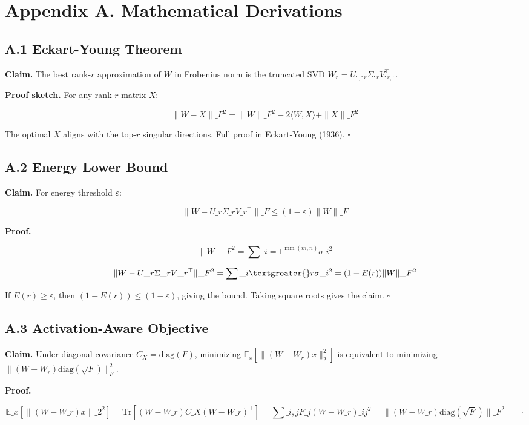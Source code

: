 
\section{Appendix A. Mathematical Derivations}

\subsection{A.1 Eckart-Young Theorem}

\textbf{Claim.} The best rank-$r$ approximation of $W$ in Frobenius norm is the 
truncated SVD $W_r = U_{:, :r} \Sigma_{:r} V_{:r, :}^\top$.

\textbf{Proof sketch.} For any rank-$r$ matrix $X$:

\[
\|W - X\|\_F^2 = \|W\|\_F^2 - 2 \langle W, X \rangle + \|X\|\_F^2
\]

The optimal $X$ aligns with the top-$r$ singular directions. Full proof in 
Eckart-Young (1936). $\square$

\subsection{A.2 Energy Lower Bound}

\textbf{Claim.} For energy threshold $\varepsilon$:

\[
\|W - U\_r \Sigma\_r V\_r^\top\|\_F \leq (1 - \varepsilon) \|W\|\_F
\]

\textbf{Proof.}

\[
\|W\|\_F^2 = \sum\_{i=1}^{\min(m, n)} \sigma\_i^2
\]

\[
\|W - U\_r \Sigma\_r V\_r^\top\|\_F^2 = \sum\_{i \textgreater{} r} \sigma\_i^2 = (1 - E(r)) \|W\|\_F^2
\]

If $E(r) \geq \varepsilon$, then $(1 - E(r)) \leq (1 - \varepsilon)$, giving 
the bound. Taking square roots gives the claim. $\square$

\subsection{A.3 Activation-Aware Objective}

\textbf{Claim.} Under diagonal covariance $C_X = \text{diag}(F)$, minimizing 
$\mathbb{E}_x[\|(W - W_r) x\|_2^2]$ is equivalent to minimizing 
$\|(W - W_r) \text{diag}(\sqrt{F})\|_F^2$.

\textbf{Proof.}

\[
\mathbb{E}\_x[\|(W - W\_r) x\|\_2^2] = \text{Tr}[(W - W\_r) C\_X (W - W\_r)^\top]
= \sum\_{i, j} F\_j (W - W\_r)\_{ij}^2
= \|(W - W\_r) \text{diag}(\sqrt{F})\|\_F^2 \qquad \square
\]

